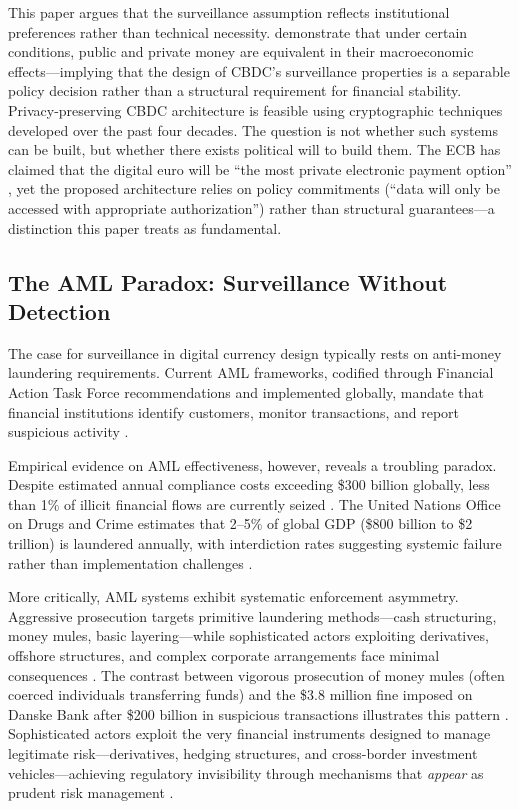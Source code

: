 \documentclass[11pt]{article}
\begin{document}
This paper argues that the surveillance assumption reflects institutional preferences rather than technical necessity. \citet{BrunnermeierNiepelt2019} demonstrate that under certain conditions, public and private money are equivalent in their macroeconomic effects---implying that the design of CBDC's surveillance properties is a separable policy decision rather than a structural requirement for financial stability. Privacy-preserving CBDC architecture is feasible using cryptographic techniques developed over the past four decades. The question is not whether such systems can be built, but whether there exists political will to build them. The ECB has claimed that the digital euro will be ``the most private electronic payment option'' \citep{ECB2024Blog}, yet the proposed architecture relies on policy commitments (``data will only be accessed with appropriate authorization'') rather than structural guarantees---a distinction this paper treats as fundamental.

\subsection{The AML Paradox: Surveillance Without Detection}

The case for surveillance in digital currency design typically rests on anti-money laundering requirements. Current AML frameworks, codified through Financial Action Task Force recommendations and implemented globally, mandate that financial institutions identify customers, monitor transactions, and report suspicious activity \citep{FATF2012}.

Empirical evidence on AML effectiveness, however, reveals a troubling paradox. Despite estimated annual compliance costs exceeding \$300 billion globally, less than 1\% of illicit financial flows are currently seized \citep{Pol2020}. The United Nations Office on Drugs and Crime estimates that 2--5\% of global GDP (\$800 billion to \$2 trillion) is laundered annually, with interdiction rates suggesting systemic failure rather than implementation challenges \citep{UNODC2011}.

More critically, AML systems exhibit systematic enforcement asymmetry. Aggressive prosecution targets primitive laundering methods---cash structuring, money mules, basic layering---while sophisticated actors exploiting derivatives, offshore structures, and complex corporate arrangements face minimal consequences \citep{farzulla2025hedging}. The contrast between vigorous prosecution of money mules (often coerced individuals transferring funds) and the \$3.8 million fine imposed on Danske Bank after \$200 billion in suspicious transactions illustrates this pattern \citep{Lynch2022, Europol2021}. Sophisticated actors exploit the very financial instruments designed to manage legitimate risk---derivatives, hedging structures, and cross-border investment vehicles---achieving regulatory invisibility through mechanisms that \textit{appear} as prudent risk management \citep{farzulla2025hedging}.
\end{document}

